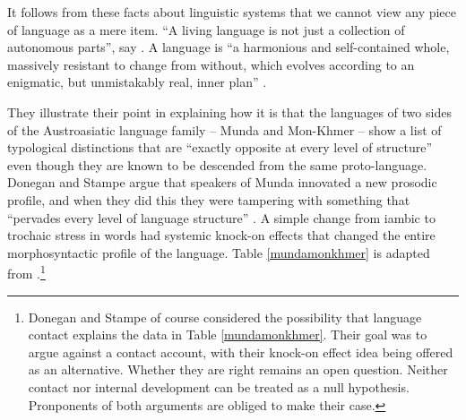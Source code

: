 It follows from these facts about linguistic systems that we cannot 
view any piece of language as a mere item. ``A living language is not 
just a collection of autonomous parts'', say \citet[1]{donegan_rhythm_1983}. A language is ``a harmonious and self-contained whole, massively 
resistant to change from without, which evolves according to an 
enigmatic, but unmistakably real, inner plan'' \citep[1]{donegan_rhythm_1983}. 



They illustrate their point in explaining how it is that the languages 
of two sides of the Austroasiatic language family -- Munda and 
Mon-Khmer -- show a list of typological distinctions that are ``exactly 
opposite at every level of structure'' \citep[111]{donegan_south-east_2002} 
even though they are known to be descended from the same proto-language. Donegan and Stampe argue that speakers of Munda innovated a new prosodic profile, and when they did this they 
were tampering with something that ``pervades every level of language 
structure'' \citep[14]{donegan_rhythm_1983}. A simple change from iambic to trochaic stress in words had systemic knock-on effects that changed the entire morphosyntactic profile of the language. Table \ref{mundamonkhmer}
is adapted from \citet[1--2]{donegan_rhythm_1983}.\footnote{Donegan and Stampe of course considered the possibility that language contact explains the data in Table \ref{mundamonkhmer}. Their goal was to argue against a contact account, with their knock-on effect idea being offered as an alternative. Whether they are right remains an open question. Neither contact nor internal development can be treated as a null hypothesis. Pronponents of both arguments are obliged to make their case.}


